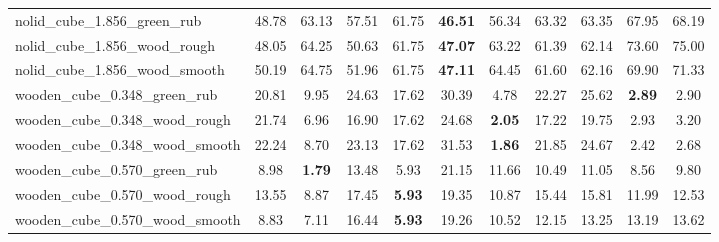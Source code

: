 \begin{table}[H]
{\begin{tabular}{l cccccccccc}
        nolid\_cube\_1.856\_green\_rub & 48.78 & 63.13 & 57.51 & 61.75 & \textbf{46.51} & 56.34 & 63.32 & 63.35 & 67.95 & 68.19 \\
        nolid\_cube\_1.856\_wood\_rough & 48.05 & 64.25 & 50.63 & 61.75 & \textbf{47.07} & 63.22 & 61.39 & 62.14 & 73.60 & 75.00 \\
        nolid\_cube\_1.856\_wood\_smooth & 50.19 & 64.75 & 51.96 & 61.75 & \textbf{47.11} & 64.45 & 61.60 & 62.16 & 69.90 & 71.33 \\
        wooden\_cube\_0.348\_green\_rub & 20.81 & 9.95 & 24.63 & 17.62 & 30.39 & 4.78 & 22.27 & 25.62 & \textbf{2.89} & 2.90 \\
        wooden\_cube\_0.348\_wood\_rough & 21.74 & 6.96 & 16.90 & 17.62 & 24.68 & \textbf{2.05} & 17.22 & 19.75 & 2.93 & 3.20 \\
        wooden\_cube\_0.348\_wood\_smooth & 22.24 & 8.70 & 23.13 & 17.62 & 31.53 & \textbf{1.86} & 21.85 & 24.67 & 2.42 & 2.68 \\
        wooden\_cube\_0.570\_green\_rub & 8.98 & \textbf{1.79} & 13.48 & 5.93 & 21.15 & 11.66 & 10.49 & 11.05 & 8.56 & 9.80 \\
        wooden\_cube\_0.570\_wood\_rough & 13.55 & 8.87 & 17.45 & \textbf{5.93} & 19.35 & 10.87 & 15.44 & 15.81 & 11.99 & 12.53 \\
        wooden\_cube\_0.570\_wood\_smooth & 8.83 & 7.11 & 16.44 & \textbf{5.93} & 19.26 & 10.52 & 12.15 & 13.25 & 13.19 & 13.62 \\
        \bottomrule
    \end{tabular}
    }
\end{table}
